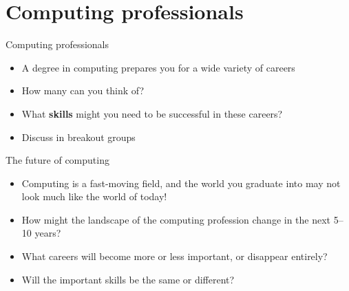 \part{Computing professionals}
\frame{\partpage}

\begin{frame}{Computing professionals}
	\begin{itemize}
		\pause\item A degree in computing prepares you for a wide variety of careers
		\pause\item How many can you think of?
		\pause\item What \textbf{skills} might you need to be successful in these careers?
		\pause\item Discuss in breakout groups
	\end{itemize}
\end{frame}

\begin{frame}{The future of computing}
	\begin{itemize}
		\pause\item Computing is a fast-moving field, and the world you graduate into may not look much like the world of today!
		\pause\item How might the landscape of the computing profession change in the next 5--10 years?
		\pause\item What careers will become more or less important, or disappear entirely?
		\pause\item Will the important skills be the same or different?
	\end{itemize}
\end{frame}
